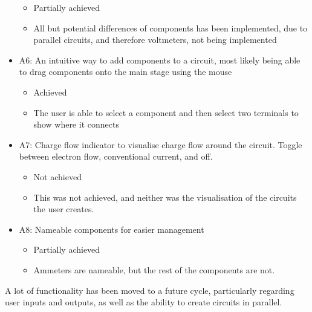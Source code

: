 \begin{itemize}
        \begin{itemize}
            \item Partially achieved
            \item All but potential differences of components has been implemented, due to parallel circuits, and therefore voltmeters, not being implemented
        \end{itemize}
        \item A6: An intuitive way to add components to a circuit, most likely being able to drag components onto the main stage using the mouse
        \begin{itemize}
            \item Achieved
            \item The user is able to select a component and then select two terminals to show where it connects
        \end{itemize}
        \item A7: Charge flow indicator to visualise charge flow around the circuit. Toggle between electron flow, conventional current, and off. 
        \begin{itemize}
            \item Not achieved
            \item This was not achieved, and neither was the visualisation of the circuits the user creates. 
        \end{itemize}
        \item A8: Nameable components for easier management
        \begin{itemize}
            \item Partially achieved
            \item Ammeters are nameable, but the rest of the components are not. 
        \end{itemize}
    \end{itemize}

    A lot of functionality has been moved to a future cycle, particularly regarding user inputs and outputs, as well as the ability to create circuits in parallel. 


